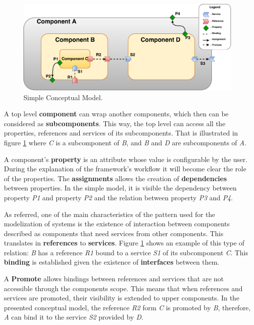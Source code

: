 \documentclass[12pt]{article}
\newcounter{subsubsubsection}[subsubsection]
\begin{document}
{\begin{figure}[H]
\centering
\includegraphics[scale=0.25]{images/ModelExample}
\caption{Simple Conceptual Model.}
\label{fig:ModelExample} 
\end{figure}

A top level \textbf{component} can wrap another components, which then can be considered as \textbf{subcomponents}. This way, the top level can access all the properties, references and services of its subcomponents. That is illustrated in figure \ref{fig:ModelExample} where \textit{C} is a subcomponent of \textit{B}, and \textit{B} and \textit{D} are subcomponents of \textit{A}.

A component's \textbf{property} is an attribute whose value is configurable by the user. During the explanation of the framework's workflow it will become clear the role of the properties. The \textbf{assignments} allows the creation of \textbf{dependencies} between properties. In the simple model, it is visible the dependency between property \textit{P1} and property \textit{P2} and the relation between property \textit{P3} and \textit{P4}.

As referred, one of the main characteristics of the pattern used for the modelization of systems is the existence of interaction between components described as components that need services from other components. This translates in \textbf{references} to \textbf{services}. Figure \ref{fig:ModelExample} shows an example of this type of relation: \textit{B} has a reference \textit{R1} bound to a service \textit{S1} of its subcomponent \textit{C}. This \textbf{binding} is established given the existence of \textbf{interfaces} between them. 

A \textbf{Promote} allows bindings between references and services that are not accessible through the components scope. This means that when references and services are promoted, their visibility is extended to upper components. In the presented conceptual model, the reference \textit{R2} form \textit{C} is promoted by \textit{B}, therefore, \textit{A} can bind it to the service \textit{S2} provided by \textit{D}.


}
\end{document}
